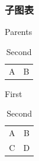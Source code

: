 \documentclass{ctexart}
\begin{document}
        \subsubsection{子图表}
            \begin{table}
                \renewcommand{\thesubtable}{(\alph{subtable})}
                \captionsetup[sub]{labelformat=simple}
                \renewcommand{\subtablename}{子表}
                \renewcommand{\subtableautorefname}{子表}
                \caption{Parents}
                \begin{subtable}[b]{.5\linewidth}
                    \centering
                    \begin{tabular}{|c|c|}
                        A&B\\
                    \end{tabular}
                    \caption{First}\label{subtbl1}
                \end{subtable} 
                \begin{subtable}[b]{.5\linewidth}
                    \centering
                    \begin{tabular}{|c|c|}
                        A&B\\
                        C&D\\
                    \end{tabular}
                    \caption{Second}\label{subtbl2}
                \end{subtable}
            \end{table}
\end{document}
